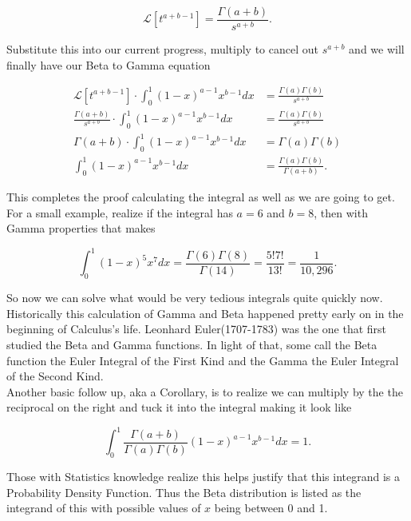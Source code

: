 \documentclass[12pt]{article}
\newcommand{\lp}{\mathscr{L}}
\begin{document}
\begin{equation*}
    \lp[t^{a+b-1}]=\frac{\Gamma(a+b)}{s^{a+b}}.
\end{equation*}

Substitute this into our current progress, multiply to cancel out $s^{a+b}$ and we will finally have our Beta to Gamma equation

\begin{align*}
    \lp[t^{a+b-1}] \cdot \int_{0}^{1} (1-x)^{a-1}x^{b-1} dx &= \frac{\Gamma(a)\Gamma(b)}{s^{a+b}} \\
    \frac{\Gamma(a+b)}{s^{a+b}} \cdot \int_{0}^{1} (1-x)^{a-1}x^{b-1} dx &= \frac{\Gamma(a)\Gamma(b)}{s^{a+b}} \\
    \Gamma(a+b) \cdot \int_{0}^{1} (1-x)^{a-1}x^{b-1} dx &= \Gamma(a)\Gamma(b) \\
    \int_{0}^{1} (1-x)^{a-1}x^{b-1} dx &= \frac{\Gamma(a)\Gamma(b)}{\Gamma(a+b)}.
\end{align*}

This completes the proof calculating the integral as well as we are going to get. \\

For a small example, realize if the integral has $a=6$ and $b=8$, then with Gamma properties that makes

\begin{equation*}
    \int_{0}^{1} (1-x)^{5}x^{7} dx = \frac{\Gamma(6)\Gamma(8)}{\Gamma(14)} = \frac{5!7!}{13!} = \frac{1}{10,296}.
\end{equation*}

So now we can solve what would be very tedious integrals quite quickly now. Historically this calculation of Gamma and Beta happened pretty early on in the beginning of Calculus's life. Leonhard Euler(1707-1783) was the one that first studied the Beta and Gamma functions. In light of that, some call the Beta function the Euler Integral of the First Kind and the Gamma the Euler Integral of the Second Kind. \\

Another basic follow up, aka a Corollary, is to realize we can multiply by the the reciprocal on the right and tuck it into the integral making it look like

\begin{equation*}
    \int_{0}^{1} \frac{\Gamma(a+b)}{\Gamma(a)\Gamma(b)}(1-x)^{a-1}x^{b-1} dx = 1.
\end{equation*}

Those with Statistics knowledge realize this helps justify that this integrand is a Probability Density Function. Thus the Beta distribution is listed as the integrand of this with possible values of $x$ being between 0 and 1.
\end{document}
